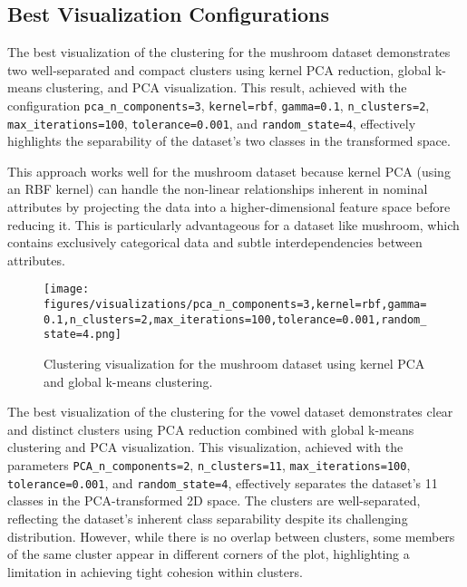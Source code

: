 \subsection{Best Visualization Configurations}
\label{subsec:best-visualization-configs}

The best visualization of the clustering for the mushroom dataset demonstrates two well-separated and compact clusters using kernel PCA reduction, global k-means clustering, and PCA visualization. This result, achieved with the configuration \texttt{pca\_n\_components=3}, \texttt{kernel=rbf}, \texttt{gamma=0.1}, \texttt{n\_clusters=2}, \texttt{max\_iterations=100}, \texttt{tolerance=0.001}, and \texttt{random\_state=4}, effectively highlights the separability of the dataset's two classes in the transformed space.

This approach works well for the mushroom dataset because kernel PCA (using an RBF kernel) can handle the non-linear relationships inherent in nominal attributes by projecting the data into a higher-dimensional feature space before reducing it. This is particularly advantageous for a dataset like mushroom, which contains exclusively categorical data and subtle interdependencies between attributes.

\begin{figure}[h!]
    \centering
    \texttt{[image: figures/visualizations/pca\_n\_components=3,kernel=rbf,gamma=0.1,n\_clusters=2,max\_iterations=100,tolerance=0.001,random\_state=4.png]}
    \caption{Clustering visualization for the mushroom dataset using kernel PCA and global k-means clustering.}
    \label{fig:mushroom_clustering}
\end{figure}

The best visualization of the clustering for the vowel dataset demonstrates clear and distinct clusters using PCA reduction combined with global k-means clustering and PCA visualization. This visualization, achieved with the parameters \texttt{PCA\_n\_components=2}, \texttt{n\_clusters=11}, \texttt{max\_iterations=100}, \texttt{tolerance=0.001}, and \texttt{random\_state=4}, effectively separates the dataset's 11 classes in the PCA-transformed 2D space. The clusters are well-separated, reflecting the dataset's inherent class separability despite its challenging distribution. However, while there is no overlap between clusters, some members of the same cluster appear in different corners of the plot, highlighting a limitation in achieving tight cohesion within clusters.

